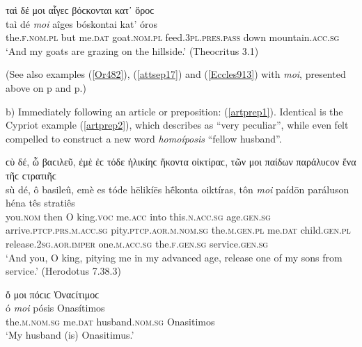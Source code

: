 \begin{exe}
\ex ταὶ δέ μοι αἶγεϲ βόϲκονται κατ᾽ ὄροϲ\\
\gll taì dé \emph{moi} aîges bóskontai kat' óros\\
the.\textsc{f.nom.pl} but me.\textsc{dat} goat.\textsc{nom.pl}
feed.\textsc{3pl.pres.pass} down mountain.\textsc{acc.sg}\\
\trans `And my goats are grazing on the hillside.' (Theocritus 3.1)
\label{part7}
\end{exe}

(See also examples (\ref{Or482}), (\ref{attsep17}) and (\ref{Eccles913}) with \textit{moi}, presented above on p\pageref{Or482} and p\pageref{Eccles913}.)

b) Immediately following an article or preposition: (\ref{artprep1}). Identical is the Cy\-priot example (\ref{artprep2}), which \citet[323]{Hoffmann1891} describes as ``very peculiar'', while \citet[139--140]{Meister1889} even felt compelled to construct a new word \textit{homoíposis} ``fellow husband''.

\begin{exe}
\ex ϲὺ δέ, ὦ βαϲιλεῦ, ἐμὲ ἐϲ τόδε ἡλικίηϲ ἥκοντα οἰκτίραϲ, τῶν μοι παίδων παράλυϲον ἕνα τῆϲ ϲτρατιῆϲ\\
\gll sù dé, ô basileû, emè es tóde hēlikíēs hḗkonta oiktíras, tôn \emph{moi} paídōn paráluson héna tês stratiês\\
you.\textsc{nom} then O king.\textsc{voc} me.\textsc{acc} into this.\textsc{n.acc.sg} age.\textsc{gen.sg} arrive.\textsc{ptcp.prs.m.acc.sg} pity.\textsc{ptcp.aor.m.nom.sg} the.\textsc{m.gen.pl} me.\textsc{dat} child.\textsc{gen.pl} release.\textsc{2sg.aor.imper} one.\textsc{m.acc.sg}
the.\textsc{f.gen.sg} service.\textsc{gen.sg}\\
\trans `And you, O king, pitying me in my advanced age, release one of my sons from service.' (Herodotus 7.38.3)
\label{artprep1}
\end{exe}

\begin{exe}
\ex ὄ μοι πόϲιϲ Ὀναϲίτιμοϲ\\
\gll ó \emph{moi} pósis Onasítimos\\
the.\textsc{m.nom.sg} me.\textsc{dat} husband.\textsc{nom.sg} Onasitimos\\
\trans `My husband (is) Onasitimus.' \citep[no. 26]{Deecke1884}
\label{artprep2}
\end{exe}

